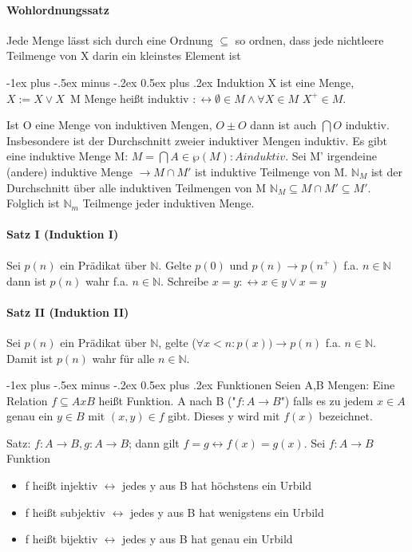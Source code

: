\documentclass[10pt,landscape]{article}
\makeatletter
\renewcommand{\section}{\@startsection{section}{1}{0mm}%
                                {-1ex plus -.5ex minus -.2ex}%
                                {0.5ex plus .2ex}%
                                {\normalfont\large\bfseries}}
\makeatother
\begin{document}
\begin{multicols}{3}
\paragraph{Wohlordnungssatz}
Jede Menge lässt sich durch eine Ordnung $\subseteq$ so ordnen, dass jede nichtleere Teilmenge von X darin ein kleinstes Element ist

\section{Induktion}
X ist eine Menge, $X:=X\vee {X}$\
M Menge heißt induktiv $:\leftrightarrow \emptyset \in M \wedge \forall X \in M$  $X^+ \in M$.

Ist O eine Menge von induktiven Mengen, $O\pm O$ dann ist auch $\bigcap O$ induktiv. Insbesondere ist der Durchschnitt zweier induktiver Mengen induktiv. Es gibt eine induktive Menge M: $M =\bigcap {A \in \wp(M): A induktiv}$.
Sei M' irgendeine (andere) induktive Menge $\rightarrow M \cap M'$ ist induktive Teilmenge von M. $\mathbb{N}_M$ ist der Durchschnitt über alle induktiven Teilmengen von M $\mathbb{N}_M \subseteq M \cap M' \subseteq M'$. Folglich ist $\mathbb{N}_m$ Teilmenge jeder induktiven Menge.

\paragraph{Satz I (Induktion I)}
Sei $p(n)$ ein Prädikat über $\mathbb{N}$. Gelte $p(0)$ und $p(n)\rightarrow p(n^{+})$ f.a. $n\in \mathbb{N}$ dann ist $p(n)$ wahr f.a. $n \in \mathbb{N}$. Schreibe $x=y:\leftrightarrow x\in y \vee x=y$

\paragraph{Satz II (Induktion II)}
Sei $p(n)$ ein Prädikat über $\mathbb{N}$, gelte ($\forall x < n: p(x)) \rightarrow p(n)$ f.a. $n\in \mathbb{N}$. Damit ist $p(n)$ wahr für alle $n\in \mathbb{N}$.

\section{Funktionen}
Seien A,B Mengen: Eine Relation $f\subseteq A x B$ heißt Funktion. A nach B ("$f:A\rightarrow B$") falls es zu jedem $x\in A$ genau ein $y\in B$ mit $(x,y)\in f$ gibt. Dieses y wird mit $f(x)$ bezeichnet.

Satz: $f:A\rightarrow B, g:A\rightarrow B$; dann gilt $f=g \leftrightarrow f(x)=g(x)$. Sei $f:A\rightarrow B$ Funktion
\begin{itemize}
    \item f heißt injektiv $\leftrightarrow$ jedes y aus B hat höchstens ein Urbild
    \item f heißt subjektiv $\leftrightarrow$ jedes y aus B hat wenigstens ein Urbild
    \item f heißt bijektiv $\leftrightarrow$ jedes y aus B hat genau ein Urbild
\end{itemize}


\end{multicols}
\end{document}
